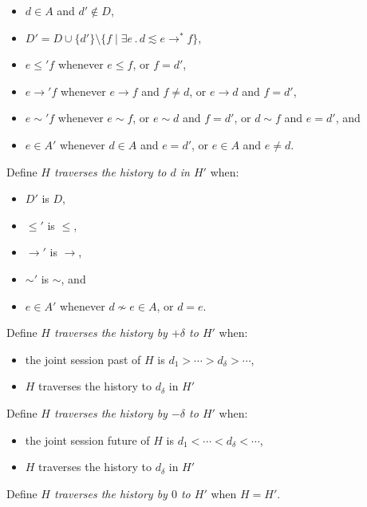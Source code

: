 \documentclass{article}
\newcommand{\aNH}{H}
\newcommand{\Docs}{D}
\newcommand{\Active}{A}
\newcommand{\parentOf}{\rightarrow}
\newcommand{\leChron}{\le}
\newcommand{\ltChron}{<}
\newcommand{\gtChron}{>}
\newcommand{\eqSess}{\sim}
\newcommand{\ltSess}{\lesssim}
\newcommand{\aDoc}{d}
\newcommand{\bDoc}{e}
\newcommand{\cDoc}{f}
\newcommand{\st}{\mathbin.}
\begin{document}
\begin{itemize}
\item $\aDoc\in\Active$ and $\aDoc'\notin\Docs$,
\item $\Docs' = \Docs \cup \{\aDoc'\} \setminus
  \{ \cDoc \mid \exists \bDoc \st \aDoc \ltSess \bDoc \parentOf^* \cDoc \}$,
\item $\bDoc \leChron' \cDoc$ whenever
  $\bDoc \leChron \cDoc$, or $\cDoc = \aDoc'$,
\item $\bDoc \parentOf' \cDoc$ whenever
  $\bDoc \parentOf \cDoc$ and $\cDoc \neq \aDoc$, or
  $\bDoc \parentOf \aDoc$ and $\cDoc = \aDoc'$,
\item $\bDoc \eqSess' \cDoc$ whenever
  $\bDoc \eqSess \cDoc$, or
  $\bDoc \eqSess \aDoc$ and $\cDoc = \aDoc'$, or
  $\aDoc \eqSess \cDoc$ and $\bDoc = \aDoc'$, and
\item $\bDoc \in \Active'$ whenever
  $\aDoc \in \Active$ and $\bDoc=\aDoc'$, or
  $\bDoc \in \Active$ and $\bDoc\ne\aDoc$.
\end{itemize}
Define \emph{$\aNH$ traverses the history to $\aDoc$ in $\aNH'$} when:
\begin{itemize}
\item $\Docs'$ is $\Docs$,
\item $\leChron'$ is $\leChron$,
\item $\parentOf'$ is $\parentOf$,
\item $\eqSess'$ is $\eqSess$, and
\item $\bDoc\in\Active'$ whenever $\aDoc\not\eqSess\bDoc \in \Active$, or
  $\aDoc=\bDoc$.
\end{itemize}
Define \emph{$\aNH$ traverses the history by $+\delta$ to $\aNH'$} when:
\begin{itemize}
\item the joint session past of $\aNH$ is $\aDoc_1 \gtChron \cdots \gtChron \aDoc_\delta \gtChron \cdots$,
\item $H$ traverses the history to $d_\delta$ in $H'$
\end{itemize}
Define \emph{$\aNH$ traverses the history by $-\delta$ to $\aNH'$} when:
\begin{itemize}
\item the joint session future of $\aNH$ is $\aDoc_1 \ltChron \cdots \ltChron \aDoc_\delta \ltChron \cdots$,
\item $H$ traverses the history to $d_\delta$ in $H'$
\end{itemize}
Define \emph{$\aNH$ traverses the history by $0$ to $\aNH'$} when $\aNH=\aNH'$.
\end{document}
